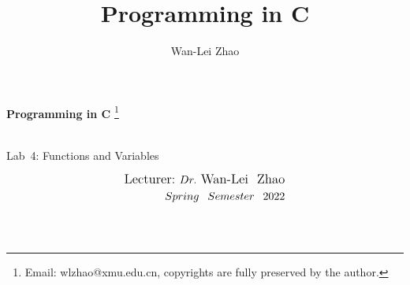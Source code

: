 \documentclass[t]{beamer}
\title{Programming in C}
\author{Wan-Lei Zhao}
\newcommand\blfootnote[1]{
  \begingroup
  \renewcommand\thefootnote{}\footnote{#1}
  \addtocounter{footnote}{-1}
  \endgroup
}
\begin{document}
\begin{frame}
   \begin{center}
    \vspace{24pt}
    \Huge\textbf{Programming in C}\blfootnote{Email: wlzhao@xmu.edu.cn, copyrights are fully preserved by the author.}\\
     \Huge{\mbox{Lab 4:} Functions and Variables}
    \vspace{36pt}
  \end{center}
  \begin{align*}
   \vspace{18pt}
      \large{\mbox{Lecturer:}~Dr.~\mbox{Wan-Lei~~Zhao}} \\
      \large{Spring~~Semester~~2022} \\
   \vspace{30pt}
  \end{align*}
\end{frame}



\section{}
\end{document}
